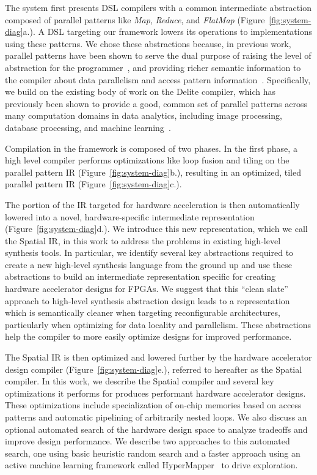 The system first presents DSL compilers with a common intermediate abstraction composed of
parallel patterns like \emph{Map}, \emph{Reduce}, and \emph{FlatMap} (Figure~\ref{fig:system-diag}a.).
A DSL targeting our framework lowers its operations to implementations using these patterns.
We chose these abstractions because, in previous work, parallel patterns have
been shown to serve the dual purpose of raising the
level of abstraction for the
programmer~\cite{ecoop13sujeeth,pldi13halide}, and providing richer
semantic information to the compiler about data parallelism
and access pattern information~\cite{delite-tecs14}.
Specifically, we build on the existing body of work
on the Delite compiler, which has previously been shown
to provide a good, common set of parallel patterns across many computation domains in data analytics, including
image processing, database processing, and machine learning~\cite{pldi13halide,ecoop13sujeeth}.

Compilation in the framework is composed of two phases. In the first phase,
a high level compiler performs optimizations like loop fusion and tiling
on the parallel pattern IR (Figure~\ref{fig:system-diag}b.), resulting in an
optimized, tiled parallel pattern IR (Figure~\ref{fig:system-diag}c.).

The portion of the IR targeted for hardware acceleration is then automatically
lowered into a novel, hardware-specific intermediate
representation (Figure~\ref{fig:system-diag}d.).
We introduce this new representation, which we call the Spatial IR,
in this work to address the problems in existing
high-level synthesis tools. In particular, we identify several key
abstractions required to create a new high-level synthesis language from the
ground up and use these abstractions to build an intermediate representation
specific for creating hardware accelerator designs for FPGAs.
We suggest that this ``clean slate'' approach to high-level synthesis abstraction
design leads to a representation which is semantically cleaner when targeting
reconfigurable architectures, particularly when optimizing for data locality and parallelism.
These abstractions help the compiler to more easily optimize designs for improved performance.

The Spatial IR is then optimized and lowered further by the hardware accelerator design compiler (Figure~\ref{fig:system-diag}e.), referred to hereafter as the Spatial compiler.
In this work, we describe the Spatial compiler and several key optimizations it
performs for produces performant hardware accelerator designs.
These optimizations include specialization of on-chip memories based on access patterns and
automatic pipelining of arbitrarily nested loops.
We also discuss an optional automated search of the hardware design space
to analyze tradeoffs and improve design performance.
We describe two approaches to this automated search, one using basic heuristic random
search and a faster approach using an active machine learning framework called
HyperMapper~\cite{Bodin2016:PACT16} to drive exploration.

